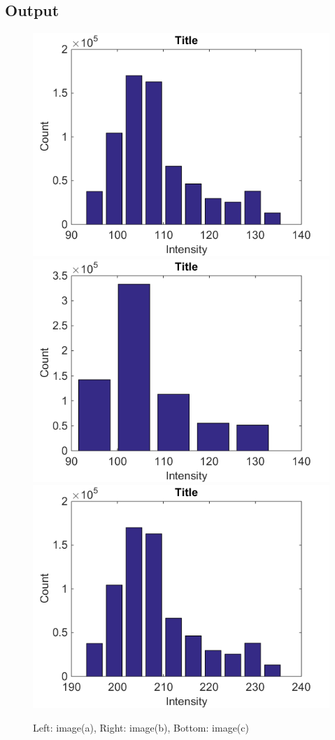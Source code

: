 \documentclass[pdftex,a4paper,10pt,titlepage]{article}
\begin{document}
\subsection{Output}
\begin{figure}[h!]
\includegraphics[scale=0.5]{task3a.png} 
\includegraphics[scale=0.5]{task3b.png} 
\center
\includegraphics[scale=0.5]{task3c.png}
\caption {Left: image(a), Right: image(b), Bottom: image(c)}
\label{fig:copied_image}
\end{figure}
\end{document}
